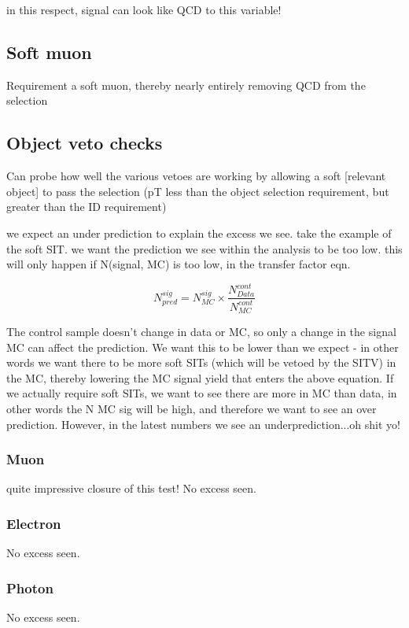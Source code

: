 in this respect, signal can look like QCD to this variable!

\subsection{Soft muon}
Requirement a soft muon, thereby nearly entirely removing QCD from the 
selection

\subsection{Object veto checks}
Can probe how well the various vetoes are working by allowing a soft [relevant 
object] to pass the selection (pT less than the object selection requirement, 
but greater than the ID requirement)


we expect an under prediction to explain the excess we see. 
take the example of the soft SIT. we want the prediction we see within the 
analysis to be too low. this will only happen if N(signal, MC) is too low, in 
the transfer factor eqn.

\begin{equation}
N_{pred}^{sig} = N_{MC}^{sig} \times \frac{N_{Data}^{cont}}{N_{MC}^{cont}}
\end{equation}

The control sample doesn't change in data or MC, so only a change in the signal 
MC can affect the prediction. We want this to be lower than we expect - in other
words we want there to be more soft SITs (which will be vetoed by the SITV) in 
the MC, thereby lowering the MC signal yield that enters the above equation. If 
we actually require soft SITs, we want to see there are more in MC than data, in
other words the N MC sig will be high, and therefore we want to see an over 
prediction. However, in the latest numbers we see an underprediction...oh shit 
yo!


\subsubsection{Muon}
quite impressive closure of this test! No excess seen.

\subsubsection{Electron}
No excess seen.

\subsubsection{Photon}
No excess seen.

